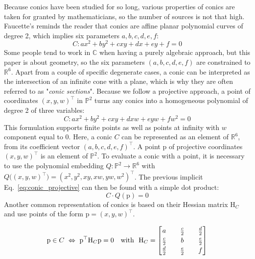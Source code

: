 \documentclass{birkjour}
\begin{document}
Because conics have been studied for so long, various properties of conics are taken for granted by mathematicians, so the number of sources is not that high. Faucette's \cite{faucette_geometric_1996} reminds the reader that conics are affine planar polynomial curves of degree 2, which implies six parameters \(a,b,c,d,e,f\):
\begin{equation} \label{eq:conic_affine}
    C: ax^2 + by^2 + cxy + dx + ey + f = 0
\end{equation}
Some people tend to work in \(\mathbb{C}\) when having a purely algebraic approach, but this paper is about geometry, so the six parameters \(\left(a,b,c,d,e,f\right)\) are constrained to \(\mathbb{R}^6\).
Apart from a couple of specific degenerate cases, a conic can be interpreted as the intersection of an infinite cone with a plane, which is why they are often referred to as "\textit{conic sections}".
Because we follow a projective approach, a point of coordinates \(\left(x,y,w\right)^\top\) in \(\mathbb{P}^2\) turns any conics into a homogeneous polynomial of degree 2 of three variables:
\begin{equation} \label{eq:conic_projective}
    C: ax^2 + by^2 + cxy + dxw + eyw + fw^2 = 0
\end{equation}
This formulation supports finite points as well as points at infinity with \(w\) component equal to 0. Here, a conic \(C\) can be represented as an element of \(\mathbb{R}^6\), from its coefficient vector \(\left(a,b,c,d,e,f\right)^\top\).
A point \(\mathrm{p}\) of projective coordinates \(\left(x,y,w\right)^\top\) is an element of \(\mathbb{P}^2\). To evaluate a conic with a point, it is necessary to use the polynomial embedding \(Q: \mathbb{P}^2 \rightarrow \mathbb{R}^6\) with \(Q\big(\left(x,y,w\right)^\top\big) = \left(x^2,y^2,xy,xw,yw,w^2\right)^\top\).
The previous implicit Eq.~\eqref{eq:conic_projective} can then be found with a simple dot product:
\begin{equation} \label{eq:conic_R6}
        C \cdot Q(\mathrm{p}) = 0
\end{equation}
Another common representation of conics is based on their Hessian matrix \(\mathrm{H}_C\) and use points of the form \(\mathrm{p}=\left(x,y,w\right)^\top\).

\begin{align} \label{eq:conic_hessian}
    & \mathrm{p}\in C ~ \Leftrightarrow ~  \mathrm{p}^\top \mathrm{H}_C \mathrm{p} = 0 & \mbox{with~~}
    \mathrm{H}_C =  \def\arraystretch{1.2}\begin{bmatrix}
a && \frac{c}{2} && \frac{d}{2} \\
\frac{c}{2} && b &&\frac{e}{2} \\
\frac{d}{2} && \frac{e}{2} && f
\end{bmatrix}
\end{align}
\end{document}
